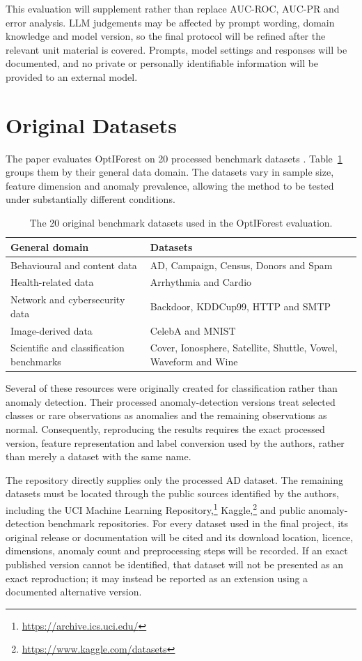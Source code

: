 \documentclass[11pt]{article}
\begin{document}
This evaluation will supplement rather than replace AUC-ROC, AUC-PR and
error analysis. LLM judgements may be affected by prompt wording,
domain knowledge and model version, so the final protocol will be refined
after the relevant unit material is covered. Prompts, model settings and
responses will be documented, and no private or personally identifiable
information will be provided to an external model.

\section{Original Datasets}

The paper evaluates OptIForest on 20 processed benchmark datasets
\citep{xiang2023optiforest}. Table~\ref{tab:original-data} groups them by
their general data domain. The datasets vary in sample size, feature
dimension and anomaly prevalence, allowing the method to be tested under
substantially different conditions.

\begin{table}[t]
\centering
\small
\begin{tabular}{p{}p{}}
\toprule
General domain & Datasets \\
\midrule
Behavioural and content data &
AD, Campaign, Census, Donors and Spam \\
Health-related data &
Arrhythmia and Cardio \\
Network and cybersecurity data &
Backdoor, KDDCup99, HTTP and SMTP \\
Image-derived data &
CelebA and MNIST \\
Scientific and classification benchmarks &
Cover, Ionosphere, Satellite, Shuttle, Vowel, Waveform and Wine \\
\bottomrule
\end{tabular}
\caption{The 20 original benchmark datasets used in the OptIForest
evaluation.}
\label{tab:original-data}
\end{table}

Several of these resources were originally created for classification
rather than anomaly detection. Their processed anomaly-detection versions
treat selected classes or rare observations as anomalies and the
remaining observations as normal. Consequently, reproducing the results
requires the exact processed version, feature representation and label
conversion used by the authors, rather than merely a dataset with the
same name.

The repository directly supplies only the processed AD dataset. The
remaining datasets must be located through the public sources identified
by the authors, including the UCI Machine Learning
Repository,\footnote{\url{https://archive.ics.uci.edu/}}
Kaggle,\footnote{\url{https://www.kaggle.com/datasets}}
and public anomaly-detection benchmark repositories. For every dataset
used in the final project, its original release or documentation will be
cited and its download location, licence, dimensions, anomaly count and
preprocessing steps will be recorded. If an exact published version
cannot be identified, that dataset will not be presented as an exact
reproduction; it may instead be reported as an extension using a
documented alternative version.
\end{document}
